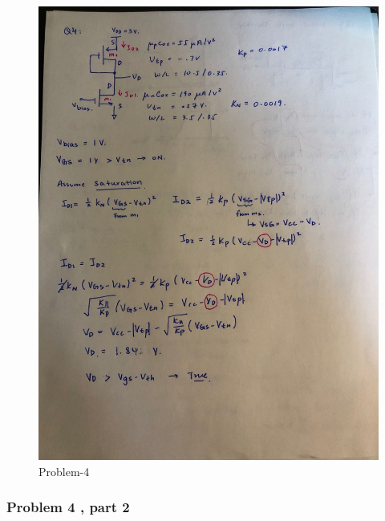 \documentclass[11pt]{article}
\begin{document}
\begin{figure}
\centering
\includegraphics{./image/Q4-sol.jpg}
\caption{Problem-4}
\end{figure}

    \hypertarget{problem-4-part-2}{%
\subsubsection{Problem 4 , part 2}\label{problem-4-part-2}}
\end{document}
